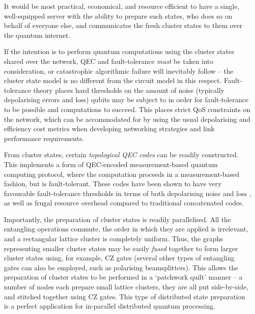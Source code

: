 \documentclass[aps,rmp,twocolumn,amsmath,amssymb,nofootinbib,superscriptaddress]{revtex4}
\begin{document}
It would be most practical, economical, and resource efficient to have a single, well-equipped server with the ability to prepare such states, who does so on behalf of everyone else, and communicates the fresh cluster states to them over the quantum internet.

If the intention is to perform quantum computations using the cluster states shared over the network, QEC and fault-tolerance \emph{must} be taken into consideration, or catastrophic algorithmic failure will inevitably follow -- the cluster state model is no different from the circuit model in this respect. Fault-tolerance theory places hard thresholds on the amount of noise (typically depolarising errors and loss) qubits may be subject to in order for fault-tolerance to be possible and computations to succeed. This places strict QoS constraints on the network, which can be accommodated for by using the usual depolarising and efficiency cost metrics when developing networking strategies and link performance requirements.

From cluster states, certain \emph{topological QEC codes} \cite{???} can be readily constructed. This implements a form of QEC-encoded measurement-based quantum computing protocol, where the computation proceeds in a measurement-based fashion, but is fault-tolerant. These codes have been shown to have very favourable fault-tolerance thresholds in terms of both depolarising noise and loss \cite{bib:StaceBarrettDohertyLoss, bib:BarrettStaceFT}, as well as frugal resource overhead compared to traditional concatenated codes.

Importantly, the preparation of cluster states is readily parallelised. All the entangling operations commute, the order in which they are applied is irrelevant, and a rectangular lattice cluster is completely uniform. Thus, the graphs representing smaller cluster states may be easily \emph{fused} together to form larger cluster states using, for example, CZ gates (several other types of entangling gates can also be employed, such as polarising beamsplitters). This allows the preparation of cluster states to be performed in a `patchwork quilt' manner -- a number of nodes each prepare small lattice clusters, they are all put side-by-side, and stitched together using CZ gates. This type of distributed state preparation is a perfect application for in-parallel distributed quantum processing.
\end{document}

